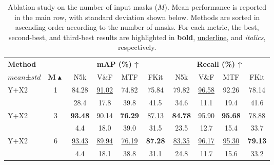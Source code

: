 \documentclass[preprint,12pt]{elsarticle}
\begin{document}

\begin{table}[t]
\centering
\scriptsize
\setlength{\tabcolsep}{4pt}
\caption{Ablation study on the number of input masks ($M$).
Mean performance is reported in the main row, with standard deviation shown below. Methods are sorted in ascending order according to the number of masks. For each metric, the best, second-best, and third-best results are highlighted in \textbf{bold}, \uline{underline}, and \textit{italics}, respectively.}
\label{tab:masks_ablation}

\begin{tabular}{lccccccccc}
\toprule
\textbf{Method} &
&
\multicolumn{4}{c}{\textbf{mAP (\%) ↑}} &
\multicolumn{4}{c}{\textbf{Recall (\%) ↑}} \\
\cmidrule(lr){3-6} \cmidrule(lr){7-10}
$mean$±$std$  & $\boldsymbol{M}\blacktriangle$ & N5k & V\&F & MTF & FKit
 & N5k & V\&F & MTF & FKit \\
\midrule

Y+X2
 & 1
 & 84.28 & \underline{91.02} & 74.82 & 75.84
 & 79.82 & \underline{96.58} & 92.26 & 78.14 \\
 & 
 & 28.4 & 17.8 & 39.8 & 41.5
 & 34.6 & 11.1 & 19.4 & 41.6 \\

\rowcolor{gray!12}
Y+X2
 & 3
 & \textbf{93.48} & 90.14 & \textbf{76.29} & \underline{87.13}
 & \textbf{84.78} & 95.90 & \textbf{95.68} & \underline{78.88} \\ \rowcolor{gray!12}
 &
 & 4.4 & 18.0 & 39.0 & 31.5
 & 23.5 & 12.7 & 15.4 & 33.7 \\

Y+X2
 & 6
 & \underline{93.43} & \underline{89.94} & \underline{76.19} & \textbf{87.28}
 & \underline{83.35} & \underline{96.17} & \underline{95.30} & \textbf{79.13} \\
 &
 & 4.4 & 18.1 & 38.8 & 31.1
 & 24.8 & 11.7 & 15.6 & 33.2 \\


\end{tabular}
\end{table}
\end{document}
